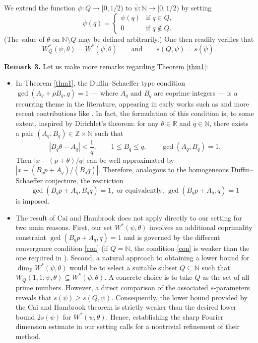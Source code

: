 \documentclass[12pt,a4paper,twoside]{article}
\begin{document}
We extend the function $\psi: Q \to [0, 1/2)$ to $\overline{\psi}: \mathbb{N} \to [0, 1/2)$ by setting
\[
\overline{\psi}(q) =
\begin{cases}
\psi(q) & \text{if } q \in Q, \\[4pt]
0 & \text{if } q \notin Q.
\end{cases}
\]
(The value of $\theta$ on $\mathbb{N}\setminus Q$ may be defined arbitrarily.) One then readily verifies that
\[
W_Q^\ast(\psi, \theta) = W^\ast(\overline{\psi}, \theta)
\qquad\text{and}\qquad
s(Q,\psi) = s(\overline{\psi}).
\]
\medskip





\noindent\textbf{Remark 3.} Let us make more remarks regarding Theorem \ref{thm1}$\colon$


\begin{itemize}

\item
In Theorem \ref{thm1}, the Duffin--Schaeffer type condition \(\gcd(A_q + p B_q, q) = 1\) --- where \(A_q\) and \(B_q\) are coprime integers --- is a recurring theme in the literature, appearing in early works such as \cite{S64} and more recent contributions like \cite{BHV24, CT24, K25}. In fact, the formulation of this condition is, to some extent, inspired by Dirichlet's theorem: for any \(\theta \in \mathbb{R}\) and \(q \in \mathbb{N}\), there exists a pair \((A_q, B_q) \in \mathbb{Z} \times \mathbb{N}\) such that
\[
|B_q \theta - A_q| < \frac{1}{q},\qquad 1 \le B_q \le q,\qquad \gcd(A_q, B_q) = 1.
\]
Then \(\left| x -  ({p + \theta})/{q} \right|\) can be well approximated by \(\left| x - ({B_q p + A_q})/({B_q q}) \right|\). Therefore, analogous to the homogeneous Duffin--Schaeffer conjecture, the restriction
\[
\gcd(B_q p + A_q, B_q q) = 1, \text{ or equivalently, }     \gcd(B_q p + A_q, q) = 1
\]
is imposed.


\item
The result  \cite[Theorem 1.4.1]{CH24} of Cai and Hambrook  does not apply directly to our setting for two main reasons. First, our set \(W^*(\psi,\theta)\) involves an additional coprimality constraint \(\gcd(B_q p + A_q, q) = 1\) and is governed by the different convergence condition \eqref{con} (if \(Q = \mathbb{N}\), the condition \eqref{con} is weaker than the one required in \cite{CH24}). Second, a natural approach to obtaining a lower bound for \(\dim_{\mathrm{F}} W^*(\psi,\theta)\) would be to select a suitable subset \(Q \subseteq \mathbb{N}\) such that \(W_Q(1,1;\psi,\theta) \subseteq W^*(\psi,\theta)\). A concrete choice is to take \(Q\) as the set of all prime numbers. However, a direct comparison of the associated \(s\)-parameters reveals that \(s(\psi) \ge s(Q,\psi)\). Consequently, the lower bound provided by the Cai and Hambrook theorem is strictly weaker than the desired lower bound \(2s(\psi)\) for \(W^*(\psi,\theta)\). Hence, establishing the sharp Fourier dimension estimate in our setting calls for a nontrivial refinement of their method.




\end{itemize}
\end{document}
